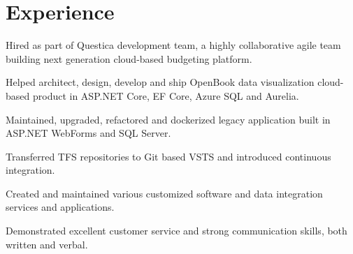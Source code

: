 \documentclass[letterpaper]{deedy-resume} %
\begin{document}
\begin{minipage}[t]{0.66\textwidth} %


\section{Experience}


\vspace{\topsep} %
\begin{tightitemize}
\item Hired as part of Questica development team, a highly collaborative agile team building next generation cloud-based budgeting platform.
\item Helped architect, design, develop and ship OpenBook data visualization cloud-based product in ASP.NET Core, EF Core, Azure SQL and Aurelia.
\item Maintained, upgraded, refactored and dockerized legacy application built in ASP.NET WebForms and SQL Server.
\item Transferred TFS repositories to Git based VSTS and introduced continuous integration.
\item Created and maintained various customized software and data integration services and applications.
\item Demonstrated excellent customer service and strong communication skills, both written and verbal.
\end{tightitemize}

\sectionspace %




\end{minipage}
\end{document}
